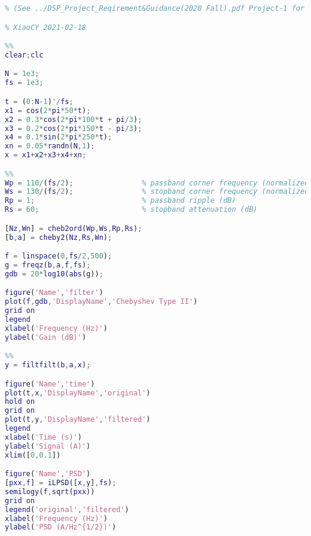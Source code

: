 \begin{lstlisting}[language=Matlab]
% Main code for DSP project
% (See ../DSP_Project_Reqirement&Guidance(2020 Fall).pdf Project-1 for detail.)

% XiaoCY 2021-02-18

%%
clear;clc

N = 1e3;
fs = 1e3;

t = (0:N-1)'/fs;
x1 = cos(2*pi*50*t);
x2 = 0.3*cos(2*pi*100*t + pi/3);
x3 = 0.2*cos(2*pi*150*t - pi/3);
x4 = 0.1*sin(2*pi*250*t);
xn = 0.05*randn(N,1);
x = x1+x2+x3+x4+xn;

%%
Wp = 110/(fs/2);                % passband corner frequency (normalized)
Ws = 130/(fs/2);                % stopband corner frequency (normalized)
Rp = 1;                         % passband ripple (dB)
Rs = 60;                        % stopband attenuation (dB)

[Nz,Wn] = cheb2ord(Wp,Ws,Rp,Rs);
[b,a] = cheby2(Nz,Rs,Wn);

f = linspace(0,fs/2,500);
g = freqz(b,a,f,fs);
gdb = 20*log10(abs(g));

figure('Name','filter')
plot(f,gdb,'DisplayName','Chebyshev Type II')
grid on
legend
xlabel('Frequency (Hz)')
ylabel('Gain (dB)')

%%
y = filtfilt(b,a,x);

figure('Name','time')
plot(t,x,'DisplayName','original')
hold on
grid on
plot(t,y,'DisplayName','filtered')
legend
xlabel('Time (s)')
ylabel('Signal (A)')
xlim([0,0.1])

figure('Name','PSD')
[pxx,f] = iLPSD([x,y],fs);
semilogy(f,sqrt(pxx))
grid on
legend('original','filtered')
xlabel('Frequency (Hz)')
ylabel('PSD (A/Hz^{1/2})')
\end{lstlisting}